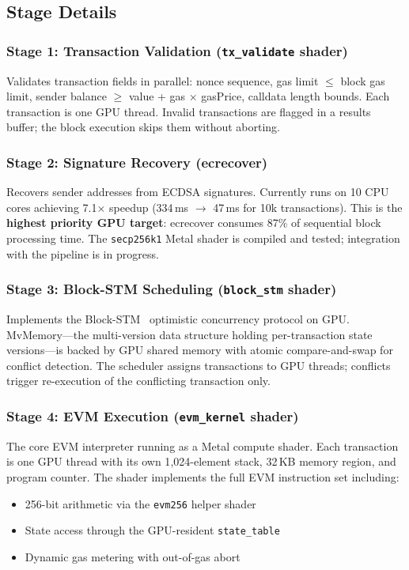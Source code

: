 \subsection{Stage Details}

\subsubsection{Stage 1: Transaction Validation (\texttt{tx\_validate} shader)}
Validates transaction fields in parallel: nonce sequence, gas limit $\leq$ block gas limit,
sender balance $\geq$ value + gas $\times$ gasPrice, calldata length bounds. Each transaction
is one GPU thread. Invalid transactions are flagged in a results buffer; the block execution
skips them without aborting.

\subsubsection{Stage 2: Signature Recovery (ecrecover)}
Recovers sender addresses from ECDSA signatures. Currently runs on 10 CPU cores achieving
7.1$\times$ speedup (334\,ms $\to$ 47\,ms for 10k transactions). This is the \textbf{highest
priority GPU target}: ecrecover consumes 87\% of sequential block processing time. The
\texttt{secp256k1} Metal shader is compiled and tested; integration with the pipeline is
in progress.

\subsubsection{Stage 3: Block-STM Scheduling (\texttt{block\_stm} shader)}
Implements the Block-STM~\cite{blockstm} optimistic concurrency protocol on GPU.
MvMemory---the multi-version data structure holding per-transaction state versions---is
backed by GPU shared memory with atomic compare-and-swap for conflict detection. The
scheduler assigns transactions to GPU threads; conflicts trigger re-execution of the
conflicting transaction only.

\subsubsection{Stage 4: EVM Execution (\texttt{evm\_kernel} shader)}
The core EVM interpreter running as a Metal compute shader. Each transaction is one GPU
thread with its own 1{,}024-element stack, 32\,KB memory region, and program counter. The
shader implements the full EVM instruction set including:
\begin{itemize}
\item 256-bit arithmetic via the \texttt{evm256} helper shader
\item State access through the GPU-resident \texttt{state\_table}
\item Dynamic gas metering with out-of-gas abort
\end{itemize}

